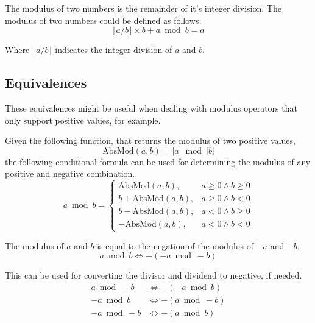 \documentclass{amsart}
\begin{document}
The modulus of two numbers is the remainder of it's integer division. The
modulus of two numbers could be defined as follows.
\begin{equation*}
  \lfloor a / b \rfloor \times b + a \bmod b = a
\end{equation*}

Where $\lfloor a / b \rfloor$ indicates the integer division of $a$ and $b$.

\subsection{Equivalences}

These equivalences might be useful when dealing with modulus operators that only
support positive values, for example.

\bigskip

Given the following function, that returns the modulus of two positive values,
\begin{equation*}
  \text{AbsMod}(a, b) = |a| \bmod |b|
\end{equation*}
the following conditional formula can be used for determining the modulus of any
positive and negative combination.
\begin{equation*}
  a \bmod b =
  \begin{cases}
    \text{AbsMod}(a, b),     & a \geq 0 \land b \geq 0 \\
    b + \text{AbsMod}(a, b), & a \geq 0 \land b < 0 \\
    b - \text{AbsMod}(a, b), & a < 0 \land b \geq 0 \\
    -\text{AbsMod}(a, b),    & a < 0 \land b < 0
  \end{cases}
\end{equation*}

\bigskip

The modulus of $a$ and $b$ is equal to the negation of the modulus of $-a$ and
$-b$.
\begin{equation*}
  a \bmod  b \iff - \left( -a \bmod -b \right)
\end{equation*}

This can be used for converting the divisor and dividend to negative, if needed.
\begin{align*}
   a \bmod -b & \iff - \left( -a \bmod  b \right) \\
  -a \bmod  b & \iff - \left(  a \bmod -b \right) \\
  -a \bmod -b & \iff - \left(  a \bmod  b \right)
\end{align*}
\end{document}
